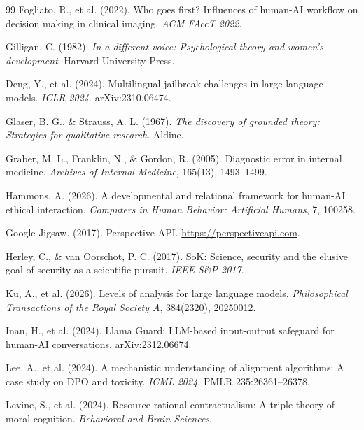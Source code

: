 \documentclass[11pt,a4paper]{article}
\begin{document}
\begin{thebibliography}{99}
Fogliato, R., et al. (2022). Who goes first? Influences of human-AI workflow on decision making in clinical imaging. \textit{ACM FAccT 2022}.

Gilligan, C. (1982). \textit{In a different voice: Psychological theory and women's development}. Harvard University Press.

Deng, Y., et al. (2024). Multilingual jailbreak challenges in large language models. \textit{ICLR 2024}. arXiv:2310.06474.

Glaser, B. G., \& Strauss, A. L. (1967). \textit{The discovery of grounded theory: Strategies for qualitative research}. Aldine.

Graber, M. L., Franklin, N., \& Gordon, R. (2005). Diagnostic error in internal medicine. \textit{Archives of Internal Medicine}, 165(13), 1493--1499.

Hammons, A. (2026). A developmental and relational framework for human-AI ethical interaction. \textit{Computers in Human Behavior: Artificial Humans}, 7, 100258.

Google Jigsaw. (2017). Perspective API. \url{https://perspectiveapi.com}.

Herley, C., \& van Oorschot, P. C. (2017). SoK: Science, security and the elusive goal of security as a scientific pursuit. \textit{IEEE S\&P 2017}.

Ku, A., et al. (2026). Levels of analysis for large language models. \textit{Philosophical Transactions of the Royal Society A}, 384(2320), 20250012.

Inan, H., et al. (2024). Llama Guard: LLM-based input-output safeguard for human-AI conversations. arXiv:2312.06674.

Lee, A., et al. (2024). A mechanistic understanding of alignment algorithms: A case study on DPO and toxicity. \textit{ICML 2024}, PMLR 235:26361--26378.

Levine, S., et al. (2024). Resource-rational contractualism: A triple theory of moral cognition. \textit{Behavioral and Brain Sciences}.


\end{thebibliography}
\end{document}
